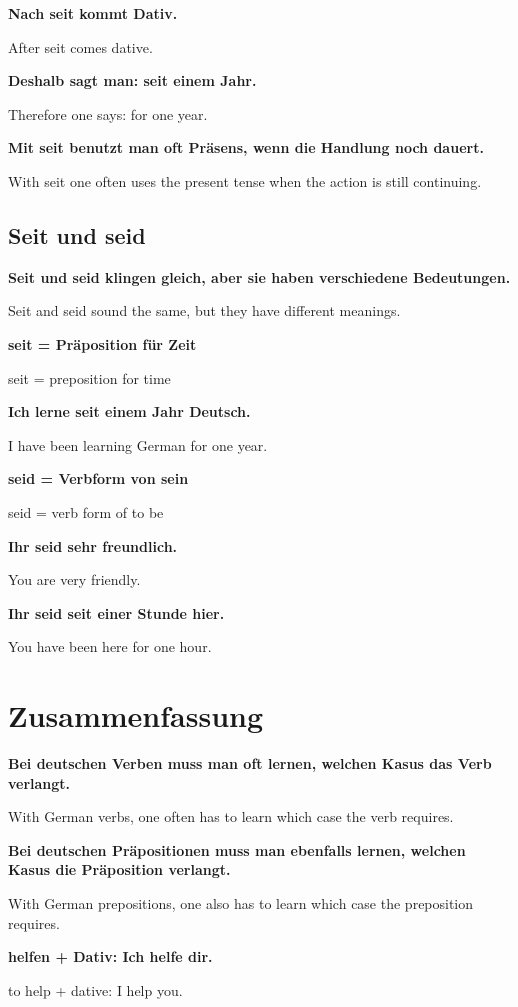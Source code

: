 \documentclass[a4paper]{article}
\newcommand{\EN}[1]{\par{\small\textcolor{TranslationGray}{#1}}\vspace{0.4em}}
\begin{document}
            \textbf{Nach seit kommt Dativ.}
            \EN{After seit comes dative.}
            
            \textbf{Deshalb sagt man: seit einem Jahr.}
            \EN{Therefore one says: for one year.}
            
            \textbf{Mit seit benutzt man oft Präsens, wenn die Handlung noch dauert.}
            \EN{With seit one often uses the present tense when the action is still continuing.}
        
        \subsection{Seit und seid}
            
            \textbf{Seit und seid klingen gleich, aber sie haben verschiedene Bedeutungen.}
            \EN{Seit and seid sound the same, but they have different meanings.}
            
            \textbf{seit = Präposition für Zeit}
            \EN{seit = preposition for time}
            
            \textbf{Ich lerne seit einem Jahr Deutsch.}
            \EN{I have been learning German for one year.}
            
            \textbf{seid = Verbform von sein}
            \EN{seid = verb form of to be}
            
            \textbf{Ihr seid sehr freundlich.}
            \EN{You are very friendly.}
            
            \textbf{Ihr seid seit einer Stunde hier.}
            \EN{You have been here for one hour.}
    
    
    \section{Zusammenfassung}
        
        \textbf{Bei deutschen Verben muss man oft lernen, welchen Kasus das Verb verlangt.}
        \EN{With German verbs, one often has to learn which case the verb requires.}
        
        \textbf{Bei deutschen Präpositionen muss man ebenfalls lernen, welchen Kasus die Präposition verlangt.}
        \EN{With German prepositions, one also has to learn which case the preposition requires.}
        
        \textbf{helfen + Dativ: Ich helfe dir.}
        \EN{to help + dative: I help you.}
        
\end{document}
